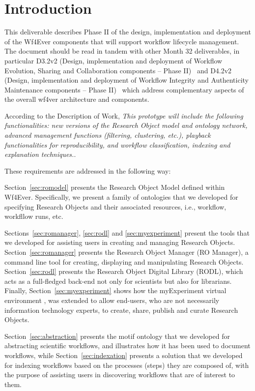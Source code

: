 \section{Introduction}

This deliverable describes Phase II of the design, implementation and
deployment of the Wf4Ever components that will support workflow
lifecycle management. The document should be read in tandem with other
Month 32 deliverables, in particular D3.2v2 (Design, implementation
and deployment of Workflow Evolution, Sharing and Collaboration
components -- Phase II)~\cite{D3.2v2} and D4.2v2 (Design,
implementation and deployment of Workflow Integrity and Authenticity
Maintenance components -- Phase II)~\cite{D4.2v2} which address
complementary aspects of the overall wf4ver architecture and
components.

According to the Description of Work, \emph{This prototype will include the following functionalities: new versions of the Research Object model and ontology network, advanced management functions (filtering, clustering, etc.), playback functionalities for reproducibility, and workflow classification, indexing and explanation techniques.}. 

These requirements are addressed in the following way:

Section~\ref{sec:romodel} presents the Research Object Model defined within Wf4Ever. Specifically, we present a family of ontologies that we developed for specifying Research Objects and their associated resources, i.e., workflow, workfllow runs, etc. 

Sections~\ref{sec:romanager}, \ref{sec:rodl} and \ref{sec:myexperiment} present the tools that we developed for assisting users in creating and managing Research Objects. Section~\ref{sec:romanager} presents the Research Object Manager (RO Manager), a command line tool for creating, displaying and manipulating Research Objects. Section~\ref{sec:rodl} presents the Research Object Digital Library (RODL), which acts as a full-fledged back-end not only for scientists but also for librarians. Finally, Section~\ref{sec:myexperiment} shows how the myExperiment virtual environment \cite{DBLP:journals/fgcs/RoureGS09}, was extended to allow end-users, who are not necessarily information technology experts, to create, share, publish and curate Research Objects.

Section~\ref{sec:abstraction} presents the motif ontology that we developed for abstracting scientific workflows, and illustrates how it has been used to document workflows, while Section~\ref{sec:indexation} presents a solution that we developed for indexing workflows based on the processes (steps) they are composed of, with the purpose of assisting users in discovering workflows that are of interest to them. 
